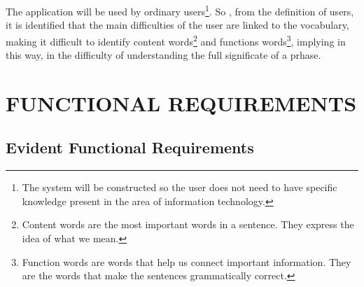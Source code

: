 \documentclass[11pt, twoside, a4paper]{book}
\begin{document}
			The application will be used by ordinary users\footnote{The system will be constructed so the user does not need to have specific knowledge present in the area of information technology.}. So , from the definition of users, it is identified that the main difficulties of the user are linked to the vocabulary, making it difficult to identify content words\footnote{Content words are the most important words in a sentence. They express the idea of what we mean.} and functions words\footnote{Function words are words that help us connect important information. They are the words that make the sentences grammatically correct.}, implying in this way, in the difficulty of understanding the full significate of a prhase.
			
	\chapter{FUNCTIONAL REQUIREMENTS}
		
		\section{Evident Functional Requirements}
		
\end{document}
